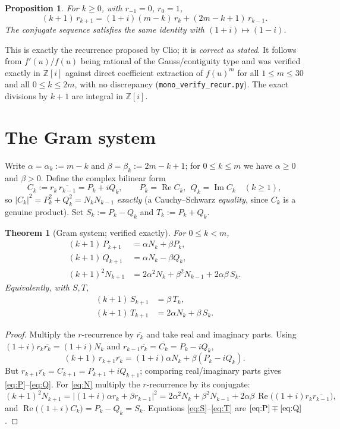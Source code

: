 \documentclass[11pt]{article}
\newtheorem{theorem}{Theorem}
\newtheorem{proposition}{Proposition}
\theoremstyle{definition}
\newcommand{\Z}{\mathbb{Z}}
\newcommand{\Zi}{\Z[i]}
\renewcommand{\Re}{\operatorname{Re}}
\renewcommand{\Im}{\operatorname{Im}}
\begin{document}
\begin{proposition}\label{prop:rrec}
For $k\ge0$, with $r_{-1}=0$, $r_0=1$,
\[
  (k+1)\,r_{k+1}=(1+i)(m-k)\,r_k+(2m-k+1)\,r_{k-1}.
\]
The conjugate sequence satisfies the same identity with $(1+i)\mapsto(1-i)$.
\end{proposition}

This is exactly the recurrence proposed by Clio; it is \emph{correct as stated}.
It follows from $f'(u)/f(u)$ being rational of the Gauss/contiguity type and was
verified exactly in $\Zi$ against direct coefficient extraction of $f(u)^m$ for
all $1\le m\le30$ and all $0\le k\le2m$, with no discrepancy
(\texttt{mono\_verify\_recur.py}). The exact divisions by $k+1$ are integral in
$\Zi$.

\section{The Gram system}

Write $\alpha=\alpha_k:=m-k$ and $\beta=\beta_k:=2m-k+1$; for $0\le k\le m$ we
have $\alpha\ge0$ and $\beta>0$. Define the complex bilinear form
\[
  C_k:=r_k\,\overline{r_{k-1}}=P_k+iQ_k,\qquad
  P_k=\Re C_k,\ \ Q_k=\Im C_k\quad(k\ge1),
\]
so $|C_k|^2=P_k^2+Q_k^2=N_kN_{k-1}$ \emph{exactly} (a Cauchy--Schwarz
\emph{equality}, since $C_k$ is a genuine product). Set $S_k:=P_k-Q_k$ and
$T_k:=P_k+Q_k$.

\begin{theorem}[Gram system; verified exactly]\label{thm:gram}
For $0\le k<m$,
\begin{align}
  (k+1)\,P_{k+1} &= \alpha N_k + \beta P_k, \label{eq:P}\\
  (k+1)\,Q_{k+1} &= \alpha N_k - \beta Q_k, \label{eq:Q}\\
  (k+1)^2 N_{k+1} &= 2\alpha^2 N_k + \beta^2 N_{k-1} + 2\alpha\beta\,S_k.
  \label{eq:N}
\end{align}
Equivalently, with $S,T$,
\begin{align}
  (k+1)\,S_{k+1} &= \beta\,T_k, \label{eq:S}\\
  (k+1)\,T_{k+1} &= 2\alpha N_k + \beta\,S_k. \label{eq:T}
\end{align}
\end{theorem}

\begin{proof}
Multiply the $r$-recurrence by $\overline{r_k}$ and take real and imaginary
parts. Using $(1+i)r_k\overline{r_k}=(1+i)N_k$ and
$r_{k-1}\overline{r_k}=\overline{C_k}=P_k-iQ_k$,
\[
  (k+1)\,r_{k+1}\overline{r_k}
   =(1+i)\alpha N_k+\beta(P_k-iQ_k).
\]
But $r_{k+1}\overline{r_k}=C_{k+1}=P_{k+1}+iQ_{k+1}$; comparing real/imaginary
parts gives \eqref{eq:P}--\eqref{eq:Q}. For \eqref{eq:N} multiply the
$r$-recurrence by its conjugate:
\[
  (k+1)^2 N_{k+1}
  =\bigl|(1+i)\alpha r_k+\beta r_{k-1}\bigr|^2
  =2\alpha^2 N_k+\beta^2 N_{k-1}+2\alpha\beta\,\Re\!\big((1+i)r_k\overline{r_{k-1}}\big),
\]
and $\Re\big((1+i)C_k\big)=P_k-Q_k=S_k$. Equations
\eqref{eq:S}--\eqref{eq:T} are $\eqref{eq:P}\mp\eqref{eq:Q}$.
\end{proof}
\end{document}
